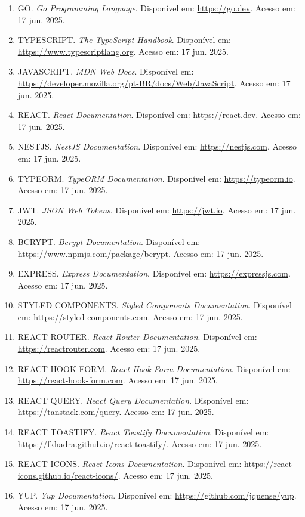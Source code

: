 \documentclass[12pt, a4paper]{article}
\begin{document}
\begin{spacing}{1.5}
\begin{spacing}{1.5}
\begin{enumerate}
    \item GO. \textit{Go Programming Language}. Disponível em: \url{https://go.dev}. Acesso em: 17 jun. 2025.
    \item TYPESCRIPT. \textit{The TypeScript Handbook}. Disponível em: \url{https://www.typescriptlang.org}. Acesso em: 17 jun. 2025.
    \item JAVASCRIPT. \textit{MDN Web Docs}. Disponível em: \url{https://developer.mozilla.org/pt-BR/docs/Web/JavaScript}. Acesso em: 17 jun. 2025.
    \item REACT. \textit{React Documentation}. Disponível em: \url{https://react.dev}. Acesso em: 17 jun. 2025.
    \item NESTJS. \textit{NestJS Documentation}. Disponível em: \url{https://nestjs.com}. Acesso em: 17 jun. 2025.
    \item TYPEORM. \textit{TypeORM Documentation}. Disponível em: \url{https://typeorm.io}. Acesso em: 17 jun. 2025.
    \item JWT. \textit{JSON Web Tokens}. Disponível em: \url{https://jwt.io}. Acesso em: 17 jun. 2025.
    \item BCRYPT. \textit{Bcrypt Documentation}. Disponível em: \url{https://www.npmjs.com/package/bcrypt}. Acesso em: 17 jun. 2025.
    \item EXPRESS. \textit{Express Documentation}. Disponível em: \url{https://expressjs.com}. Acesso em: 17 jun. 2025.
    \item STYLED COMPONENTS. \textit{Styled Components Documentation}. Disponível em: \url{https://styled-components.com}. Acesso em: 17 jun. 2025.
    \item REACT ROUTER. \textit{React Router Documentation}. Disponível em: \url{https://reactrouter.com}. Acesso em: 17 jun. 2025.
    \item REACT HOOK FORM. \textit{React Hook Form Documentation}. Disponível em: \url{https://react-hook-form.com}. Acesso em: 17 jun. 2025.
    \item REACT QUERY. \textit{React Query Documentation}. Disponível em: \url{https://tanstack.com/query}. Acesso em: 17 jun. 2025.
    \item REACT TOASTIFY. \textit{React Toastify Documentation}. Disponível em: \url{https://fkhadra.github.io/react-toastify/}. Acesso em: 17 jun. 2025.
    \item REACT ICONS. \textit{React Icons Documentation}. Disponível em: \url{https://react-icons.github.io/react-icons/}. Acesso em: 17 jun. 2025.
    \item YUP. \textit{Yup Documentation}. Disponível em: \url{https://github.com/jquense/yup}. Acesso em: 17 jun. 2025.

\end{enumerate}
\end{spacing}
\end{spacing}
\end{document}
